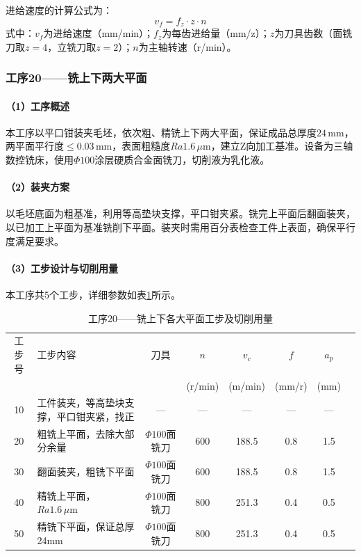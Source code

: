 \documentclass{xautCADreport}
\begin{document}
进给速度的计算公式为：
\begin{equation}
  v_f = f_z \cdot z \cdot n
  \label{eq:vf}
\end{equation}
\noindent 式中：$v_f$为进给速度（mm/min）；$f_z$为每齿进给量（mm/z）；$z$为刀具齿数（面铣刀取$z=4$，立铣刀取$z=2$）；$n$为主轴转速（r/min）。

\subsubsection{工序20——铣上下两大平面}

\paragraph{（1）工序概述}

本工序以平口钳装夹毛坯，依次粗、精铣上下两大平面，保证成品总厚度$24\,\mathrm{mm}$，两平面平行度$\leq0.03\,\mathrm{mm}$，表面粗糙度$Ra1.6\,\mu\mathrm{m}$，建立Z向加工基准。设备为三轴数控铣床，使用$\Phi100$涂层硬质合金面铣刀，切削液为乳化液。

\paragraph{（2）装夹方案}

以毛坯底面为粗基准，利用等高垫块支撑，平口钳夹紧。铣完上平面后翻面装夹，以已加工上平面为基准铣削下平面。装夹时需用百分表检查工件上表面，确保平行度满足要求。

\paragraph{（3）工步设计与切削用量}

本工序共5个工步，详细参数如表\ref{tab:op20_punch}所示。

\begin{table}[H]
  \centering
  \caption{工序20——铣上下各大平面工步及切削用量}
  \label{tab:op20_punch}
  \small
  \setlength{\tabcolsep}{5pt}
  \begin{tabular}{cp{4cm}cccccc}
    \toprule
    工步号 & 工步内容 & 刀具 & \multicolumn{1}{c}{$n$} & \multicolumn{1}{c}{$v_c$} & \multicolumn{1}{c}{$f$} & \multicolumn{1}{c}{$a_p$} \\
    & & & (r/min) & (m/min) & (mm/r) & (mm) \\
    \midrule
    10 & 工件装夹，等高垫块支撑，平口钳夹紧，找正 & — & — & — & — & — \\
    20 & 粗铣上平面，去除大部分余量 & $\Phi100$面铣刀 & 600 & 188.5 & 0.8 & 1.5 \\
    30 & 翻面装夹，粗铣下平面 & $\Phi100$面铣刀 & 600 & 188.5 & 0.8 & 1.5 \\
    40 & 精铣上平面，$Ra1.6\,\mu\mathrm{m}$ & $\Phi100$面铣刀 & 800 & 251.3 & 0.4 & 0.5 \\
    50 & 精铣下平面，保证总厚24mm & $\Phi100$面铣刀 & 800 & 251.3 & 0.4 & 0.5 \\
    \bottomrule
  \end{tabular}
\end{table}
\end{document}

